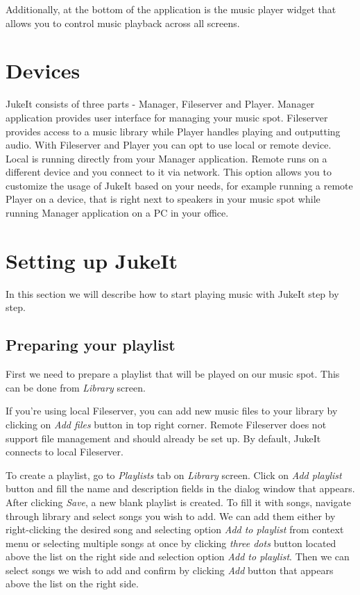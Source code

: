 \par
Additionally, at the bottom of the application is the music player widget that allows you to control music playback across all screens.

\section{Devices}

JukeIt consists of three parts - Manager, Fileserver and Player. Manager application provides user interface for managing your music spot. Fileserver provides access to a music library while Player handles playing and outputting audio. With Fileserver and Player you can opt to use local or remote device. Local is running directly from your Manager application. Remote runs on a different device and you connect to it via network. This option allows you to customize the usage of JukeIt based on your needs, for example running a remote Player on a device, that is right next to speakers in your music spot while running Manager application on a PC in your office.

\section{Setting up JukeIt}

In this section we will describe how to start playing music with JukeIt step by step.

\subsection{Preparing your playlist}

First we need to prepare a playlist that will be played on our music spot. This can be done from \emph{Library} screen.
\par
If you're using local Fileserver, you can add new music files to your library by clicking on \emph{Add files} button in top right corner. Remote Fileserver does not support file management and should already be set up. By default, JukeIt connects to local Fileserver.
\par
To create a playlist, go to \emph{Playlists} tab on \emph{Library} screen. Click on \emph{Add playlist} button and fill the name and description fields in the dialog window that appears. After clicking \emph{Save}, a new blank playlist is created. To fill it with songs, navigate through library and select songs you wish to add. We can add them either by right-clicking the desired song and selecting option \emph{Add to playlist} from context menu or selecting multiple songs at once by clicking \emph{three dots} button located above the list on the right side and selection option \emph{Add to playlist}. Then we can select songs we wish to add and confirm by clicking \emph{Add} button that appears above the list on the right side.

